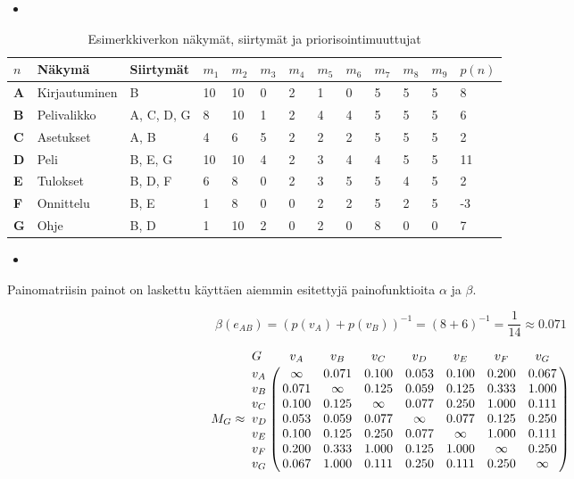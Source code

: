   \begin{itemize}
    \item <TODO: Kirjoita teksti miten verkon solmut ja kaaret poimitaan käyttöliittymästä>
  \end{itemize}

  \begin{table}[H]
    \caption{Esimerkkiverkon näkymät, siirtymät ja priorisointimuuttujat}
    \label{tab:esimerkki_verkon_priorisointi_muuttujat}
    \centering
    \begin{tabular}{lllllllllllll} \hline
    \(n\) & \textbf{Näkymä} & \textbf{Siirtymät} & \(m_1\) & \(m_2\) & \(m_3\) & \(m_4\) & \(m_5\) & \(m_6\) & \(m_7\) & \(m_8\) & \(m_9\) & \(p(n)\) \\ \hline
    \textbf{A} & Kirjautuminen & B & 10 & 10 & 0 & 2 & 1 & 0 & 5 & 5 & 5 & 8 \\
    \textbf{B} & Pelivalikko & A, C, D, G & 8 & 10 & 1 & 2 & 4 & 4 & 5 & 5 & 5 & 6 \\
    \textbf{C} & Asetukset & A, B & 4 & 6 & 5 & 2 & 2 & 2 & 5 & 5 & 5 & 2 \\
    \textbf{D} & Peli & B, E, G & 10 & 10 & 4 & 2 & 3 & 4 & 4 & 5 & 5 & 11 \\
    \textbf{E} & Tulokset & B, D, F & 6 & 8 & 0 & 2 & 3 & 5 & 5 & 4 & 5 & 2 \\
    \textbf{F} & Onnittelu & B, E & 1 & 8 & 0 & 0 & 2 & 2 & 5 & 2 & 5 & -3 \\
    \textbf{G} & Ohje & B, D & 1 & 10 & 2 & 0 & 2 & 0 & 8 & 0 & 0 & 7 \\ \hline
    \end{tabular}
  \end{table}

  \begin{itemize}
    \item <TODO: Kirjoita teksti esimerkkille painomatriisista, jota käytetään priorisoinnin syötteenä>
  \end{itemize}

  Painomatriisin painot on laskettu käyttäen aiemmin esitettyjä painofunktioita \(\alpha\) ja \(\beta\).

  \[\beta(e_{AB}) = (p(v_A) + p(v_B))^{-1} = (8 + 6)^{-1} = \frac{1}{14} \approx 0.071\]

  \[
    M_G \approx
    \bordermatrix{
      G & v_A & v_B & v_C & v_D & v_E & v_F & v_G \cr
      v_A & \infty & 0.071 & 0.100 & 0.053 & 0.100 & 0.200 & 0.067 \cr
      v_B & 0.071 & \infty & 0.125 & 0.059 & 0.125 & 0.333 & 1.000 \cr
      v_C & 0.100 & 0.125 & \infty & 0.077 & 0.250 & 1.000 & 0.111 \cr
      v_D & 0.053 & 0.059 & 0.077 & \infty & 0.077 & 0.125 & 0.250 \cr
      v_E & 0.100 & 0.125 & 0.250 & 0.077 & \infty & 1.000 & 0.111 \cr
      v_F & 0.200 & 0.333 & 1.000 & 0.125 & 1.000 & \infty & 0.250 \cr
      v_G & 0.067 & 1.000 & 0.111 & 0.250 & 0.111 & 0.250 & \infty \cr
    }
  \]


